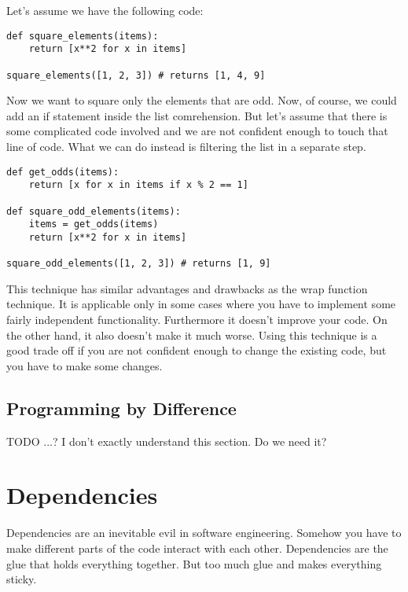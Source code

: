 Let's assume we have the following code:

\begin{programcode}{}
\begin{verbatim}
def square_elements(items):
    return [x**2 for x in items]

square_elements([1, 2, 3]) # returns [1, 4, 9]
\end{verbatim}
\end{programcode}

Now we want to square only the elements that are odd. Now, of course, we could add an if statement inside the list comrehension. But let's assume that there is some complicated code involved and we are not confident enough to touch that line of code. What we can do instead is filtering the list in a separate step.

\begin{programcode}{}
\begin{verbatim}
def get_odds(items):
    return [x for x in items if x % 2 == 1]

def square_odd_elements(items):
    items = get_odds(items)
    return [x**2 for x in items]

square_odd_elements([1, 2, 3]) # returns [1, 9]
\end{verbatim}
\end{programcode}

This technique has similar advantages and drawbacks as the wrap function technique. It is applicable only in some cases where you have to implement some fairly independent functionality. Furthermore it doesn't improve your code. On the other hand, it also doesn't make it much worse. Using this technique is a good trade off if you are not confident enough to change the existing code, but you have to make some changes.

\section{Programming by Difference}

TODO ...? I don't exactly understand this section. Do we need it?

\chapter{Dependencies}

Dependencies are an inevitable evil in software engineering. Somehow you have to make different parts of the code interact with each other. Dependencies are the glue that holds everything together. But too much glue and makes everything sticky.

